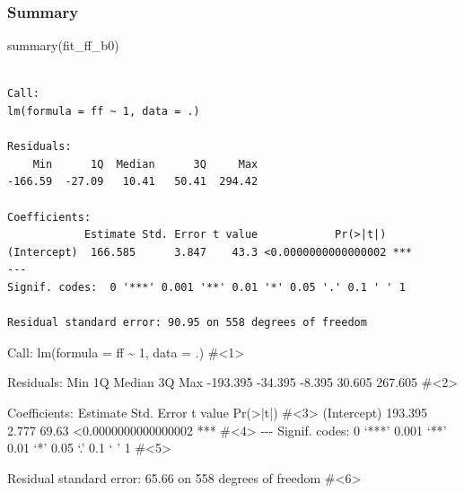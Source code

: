 \documentclass[
  letterpaper,
  DIV=11,
  numbers=noendperiod]{scrartcl}
\newenvironment{Shaded}{\begin{snugshade}}{\end{snugshade}}
\newcommand{\AttributeTok}[1]{\textcolor[rgb]{0.40,0.45,0.13}{#1}}
\newcommand{\CommentTok}[1]{\textcolor[rgb]{0.37,0.37,0.37}{#1}}
\newcommand{\DecValTok}[1]{\textcolor[rgb]{0.68,0.00,0.00}{#1}}
\newcommand{\ErrorTok}[1]{\textcolor[rgb]{0.68,0.00,0.00}{#1}}
\newcommand{\FloatTok}[1]{\textcolor[rgb]{0.68,0.00,0.00}{#1}}
\newcommand{\FunctionTok}[1]{\textcolor[rgb]{0.28,0.35,0.67}{#1}}
\newcommand{\NormalTok}[1]{\textcolor[rgb]{0.00,0.23,0.31}{#1}}
\newcommand{\SpecialCharTok}[1]{\textcolor[rgb]{0.37,0.37,0.37}{#1}}
\begin{document}
\hypertarget{summary}{%
\subsubsection{Summary}\label{summary}}

\begin{Shaded}
\begin{Highlighting}[]
\FunctionTok{summary}\NormalTok{(fit\_ff\_b0)}
\end{Highlighting}
\end{Shaded}

\begin{verbatim}

Call:
lm(formula = ff ~ 1, data = .)

Residuals:
    Min      1Q  Median      3Q     Max 
-166.59  -27.09   10.41   50.41  294.42 

Coefficients:
            Estimate Std. Error t value            Pr(>|t|)    
(Intercept)  166.585      3.847    43.3 <0.0000000000000002 ***
---
Signif. codes:  0 '***' 0.001 '**' 0.01 '*' 0.05 '.' 0.1 ' ' 1

Residual standard error: 90.95 on 558 degrees of freedom
\end{verbatim}

\hypertarget{annotated-cell-8}{%
\label{annotated-cell-8}}%
\begin{Shaded}
\begin{Highlighting}[]
\NormalTok{Call}\SpecialCharTok{:}
\FunctionTok{lm}\NormalTok{(}\AttributeTok{formula =}\NormalTok{ ff }\SpecialCharTok{\textasciitilde{}} \DecValTok{1}\NormalTok{, }\AttributeTok{data =}\NormalTok{ .) }\CommentTok{\#\textless{}1\textgreater{}}

\NormalTok{Residuals}\SpecialCharTok{:}
\NormalTok{     Min       1Q   Median       3Q      Max }
\SpecialCharTok{{-}}\FloatTok{193.395}  \SpecialCharTok{{-}}\FloatTok{34.395}   \SpecialCharTok{{-}}\FloatTok{8.395}   \FloatTok{30.605}  \FloatTok{267.605}  \CommentTok{\#\textless{}2\textgreater{}}

\NormalTok{Coefficients}\SpecialCharTok{:}
\NormalTok{            Estimate Std. Error t value            }\FunctionTok{Pr}\NormalTok{(}\SpecialCharTok{\textgreater{}}\ErrorTok{|}\NormalTok{t}\SpecialCharTok{|}\NormalTok{)    }\CommentTok{\#\textless{}3\textgreater{}}
\NormalTok{(Intercept)  }\FloatTok{193.395}      \FloatTok{2.777}   \FloatTok{69.63} \SpecialCharTok{\textless{}}\FloatTok{0.0000000000000002} \SpecialCharTok{**}\ErrorTok{*} \CommentTok{\#\textless{}4\textgreater{}}
\SpecialCharTok{{-}{-}{-}}
\NormalTok{Signif. codes}\SpecialCharTok{:}  \DecValTok{0}\NormalTok{ ‘}\SpecialCharTok{**}\ErrorTok{*}\NormalTok{’ }\FloatTok{0.001}\NormalTok{ ‘}\SpecialCharTok{**}\NormalTok{’ }\FloatTok{0.01}\NormalTok{ ‘}\SpecialCharTok{*}\NormalTok{’ }\FloatTok{0.05}\NormalTok{ ‘.’ }\FloatTok{0.1}\NormalTok{ ‘ ’ }\DecValTok{1} \CommentTok{\#\textless{}5\textgreater{}}

\NormalTok{Residual standard error}\SpecialCharTok{:} \FloatTok{65.66}\NormalTok{ on }\DecValTok{558}\NormalTok{ degrees of freedom }\CommentTok{\#\textless{}6\textgreater{}}
\end{Highlighting}
\end{Shaded}
\end{document}
